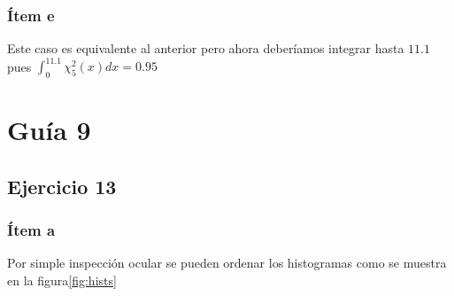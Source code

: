 \subsubsection*{Ítem e}
Este caso es equivalente al anterior pero ahora deberíamos integrar hasta $11.1$ pues $\int_0^{11.1}\chi^2_5(x)dx=0.95$


\section*{Guía 9}
\subsection*{Ejercicio 13}
\subsubsection*{Ítem a}
Por simple inspección ocular se pueden ordenar los histogramas como se muestra en la figura\ref{fig:hists}
